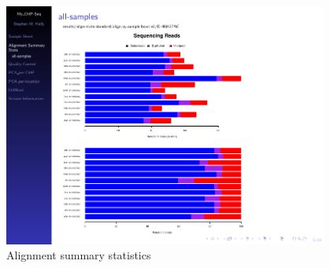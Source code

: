 \documentclass[final]{beamer}
\newlength{\sepwid}
\newlength{\onecolwid}
\newlength{\twocolwid}
\begin{document}
\begin{frame}[t]
\begin{columns}[t]
\begin{column}{\sepwid}\end{column} %

\begin{column}{\twocolwid} %

\begin{columns}[t,totalwidth=\twocolwid] %

\begin{column}{\onecolwid}%

%	
\begin{beamerboxesrounded}{} %

\begin{figure}
\includegraphics[width=1.0\linewidth, frame]{./Figures/alignStats}
\caption{Alignment summary statistics}
\label{fig:alignStats}
\end{figure}



\end{beamerboxesrounded}
\end{column}
\end{columns}
\end{column}
\end{columns}
\end{frame}
\end{document}
